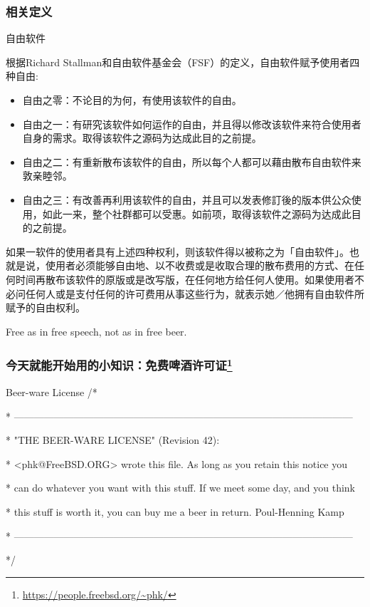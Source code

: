 \documentclass{beamer}
\begin{document}
\begin{frame}
	\frametitle{相关定义}
	\begin{block}{自由软件}
\scriptsize{
根据Richard Stallman和自由软件基金会（FSF）的定义，自由软件赋予使用者四种自由:
\begin{itemize}
	\item 自由之零：不论目的为何，有使用该软件的自由。
    \item 自由之一：有研究该软件如何运作的自由，并且得以修改该软件来符合使用者自身的需求。取得该软件之源码为达成此目的之前提。
    \item 自由之二：有重新散布该软件的自由，所以每个人都可以藉由散布自由软件来敦亲睦邻。
    \item 自由之三：有改善再利用该软件的自由，并且可以发表修訂後的版本供公众使用，如此一来，整个社群都可以受惠。如前项，取得该软件之源码为达成此目的之前提。
\end{itemize}
如果一软件的使用者具有上述四种权利，则该软件得以被称之为「自由软件」。也就是说，使用者必须能够自由地、以不收费或是收取合理的散布费用的方式、在任何时间再散布该软件的原版或是改写版，在任何地方给任何人使用。如果使用者不必问任何人或是支付任何的许可费用从事这些行为，就表示她／他拥有自由软件所赋予的自由权利。
}
	\end{block}
\normalsize
Free as in free speech, not as in free beer. 
\end{frame}

\begin{frame}
\frametitle{今天就能开始用的小知识：免费啤酒许可证\footnote{\url{https://people.freebsd.org/~phk/}}}
\begin{block}{Beer-ware License}
	\scriptsize
/*

 * ------------------------------------------------------------------------------------------------------

 * "THE BEER-WARE LICENSE" (Revision 42):

 * <phk@FreeBSD.ORG> wrote this file.  As long as you retain this notice you

 * can do whatever you want with this stuff. If we meet some day, and you think

 * this stuff is worth it, you can buy me a beer in return.   Poul-Henning Kamp

 * ------------------------------------------------------------------------------------------------------

 */
 \end{block}

\end{frame}
\end{document}

